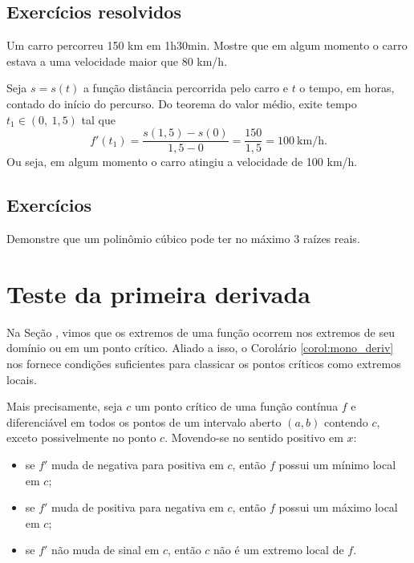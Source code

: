\subsection*{Exercícios resolvidos}

\begin{exeresol}
  Um carro percorreu 150 km em 1h30min. Mostre que em algum momento o carro estava a uma velocidade maior que 80 km/h.
\end{exeresol}
\begin{resol}
  Seja $s=s(t)$ a função distância percorrida pelo carro e $t$ o tempo, em horas, contado do início do percurso. Do teorema do valor médio, exite tempo $t_1\in (0,~1,5)$ tal que
  \begin{equation}
    f'(t_1) = \frac{s(1,5)-s(0)}{1,5-0} = \frac{150}{1,5} = 100~\text{km/h}.
  \end{equation}
  Ou seja, em algum momento o carro atingiu a velocidade de 100 km/h.
\end{resol}

\emconstrucao

\subsection*{Exercícios}

\begin{exer}
  Demonstre que um polinômio cúbico pode ter no máximo $3$ raízes reais.
\end{exer}

\section{Teste da primeira derivada}\label{cap_apderiv_sec_tder1}

Na Seção \label{cap_apderiv_sec_tder1}, vimos que os extremos de uma função ocorrem nos extremos de seu domínio ou em um ponto crítico. Aliado a isso, o Corolário \ref{corol:mono_deriv} nos fornece condições suficientes para classicar os pontos críticos como extremos locais.

Mais precisamente, seja $c$ um ponto crítico de uma função contínua $f$ e diferenciável em todos os pontos de um intervalo aberto $(a,b)$ contendo $c$, exceto possivelmente no ponto $c$. Movendo-se no sentido positivo em $x$:
\begin{itemize}
\item se $f'$ muda de negativa para positiva em $c$, então $f$ possui um mínimo local em $c$;
\item se $f'$ muda de positiva para negativa em $c$, então $f$ possui um máximo local em $c$;
\item se $f'$ não muda de sinal em $c$, então $c$ não é um extremo local de $f$.
\end{itemize}

